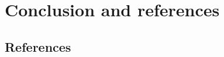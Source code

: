\documentclass[11pt]{article}
\theoremstyle{definition}
\theoremstyle{plain}
\theoremstyle{remark}
\begin{document}
\section{Conclusion and references}

\subsection*{References}
\end{document}
